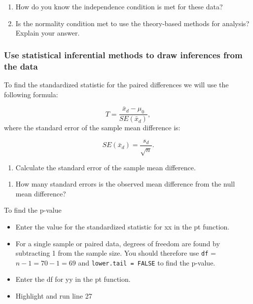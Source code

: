 \documentclass[
]{report}
\providecommand{\tightlist}{%
  \setlength{\itemsep}{0pt}\setlength{\parskip}{0pt}}
\begin{document}
\begin{enumerate}
\def\labelenumi{\arabic{enumi}.}
\setcounter{enumi}{4}
\item
  How do you know the independence condition is met for these data?
  \vspace{0.8in}
\item
  Is the normality condition met to use the theory-based methods for analysis? Explain your answer.
  \vspace{1in}
\end{enumerate}

\subsubsection*{Use statistical inferential methods to draw inferences from the data}\label{use-statistical-inferential-methods-to-draw-inferences-from-the-data-1}

To find the standardized statistic for the paired differences we will use the following formula:

\[T = \frac{\bar{x}_d - \mu_0}{SE(\bar{x}_d)},\]
where the standard error of the sample mean difference is:

\[SE(\bar{x}_d)=\frac{s_d}{\sqrt{n}}.\]

\begin{enumerate}
\def\labelenumi{\arabic{enumi}.}
\setcounter{enumi}{6}
\tightlist
\item
  Calculate the standard error of the sample mean difference.
\end{enumerate}

\vspace{0.5in}

\begin{enumerate}
\def\labelenumi{\arabic{enumi}.}
\setcounter{enumi}{7}
\tightlist
\item
  How many standard errors is the observed mean difference from the null mean difference?
\end{enumerate}

\vspace{0.5in}

To find the p-value

\begin{itemize}
\item
  Enter the value for the standardized statistic for xx in the pt function.
\item
  For a single sample or paired data, degrees of freedom are found by subtracting 1 from the sample size. You should therefore use \texttt{df} = \(n-1 = 70 - 1 = 69\) and \texttt{lower.tail\ =\ FALSE} to find the p-value.
\item
  Enter the df for yy in the pt function.
\item
  Highlight and run line 27
\end{itemize}
\end{document}
